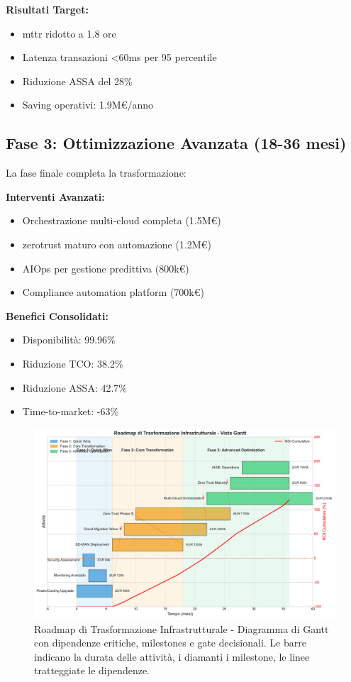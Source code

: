 \textbf{Risultati Target:}
\begin{itemize}
    \item \gls{mttr} ridotto a 1.8 ore
    \item Latenza transazioni <60ms per 95 percentile
    \item Riduzione ASSA del 28\%
    \item Saving operativi: 1.9M€/anno
\end{itemize}

\subsection{\texorpdfstring{\textbf{Fase 3: Ottimizzazione Avanzata (18-36 mesi)}}{3.6.3 - Fase 3: Ottimizzazione Avanzata (18-36 mesi)}}

La fase finale completa la trasformazione:

\textbf{Interventi Avanzati:}
\begin{itemize}
    \item Orchestrazione multi-cloud completa (1.5M€)
    \item \gls{zerotrust} maturo con automazione (1.2M€)
    \item AIOps per gestione predittiva (800k€)
    \item Compliance automation platform (700k€)
\end{itemize}

\textbf{Benefici Consolidati:}
\begin{itemize}
    \item Disponibilità: 99.96\%
    \item Riduzione TCO: 38.2\%
    \item Riduzione ASSA: 42.7\%
    \item Time-to-market: -63\%
\end{itemize}

\begin{figure}[htbp]
\centering
\includegraphics[width=1\textwidth]{thesis_figures/cap3/figura_3_4_roadmap.pdf}
\caption{Roadmap di Trasformazione Infrastrutturale - Diagramma di Gantt con dipendenze critiche, milestones e gate decisionali. Le barre indicano la durata delle attività, i diamanti i milestone, le linee tratteggiate le dipendenze.}
\label{fig:roadmap_transformation}
\end{figure}


